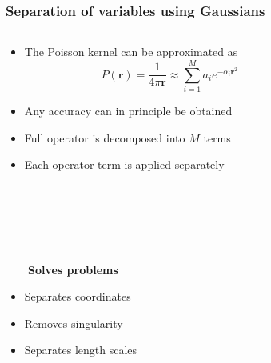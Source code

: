 \documentclass[mathserif, 8pt]{beamer}
\begin{document}
\begin{frame}
    \frametitle{Separation of variables using Gaussians}
    \begin{columns}
    \begin{column}{.50\textwidth}
    \begin{itemize}
	\item The Poisson kernel can be approximated as
	    \begin{equation}
		\nonumber
		P(\boldsymbol{r}) = \frac{1}{4\pi\boldsymbol{r}} \approx \sum_{i=1}^M a_i e^{-\alpha_i \boldsymbol{r}^2} 
	    \end{equation}
	\item Any accuracy can in principle be obtained
	\item Full operator is decomposed into $M$ terms
	\item Each operator term is applied separately
    \end{itemize}
    \ \\
    \ \\
    \ \\
    \ \\
    \ \\
    \pause
    \pause
    \pause
    \pause
    \pause
    \pause
    \pause
    \ \ \ \ \textbf{Solves problems}
    \begin{itemize}
	\item	Separates coordinates
	\item	Removes singularity
	\item	Separates length scales
    \end{itemize}
    \end{column}
    \begin{column}{.50\textwidth}
	\only<1,2,3,4,5>{\ \\}

\end{column}
\end{columns}
\end{frame}
\end{document}
